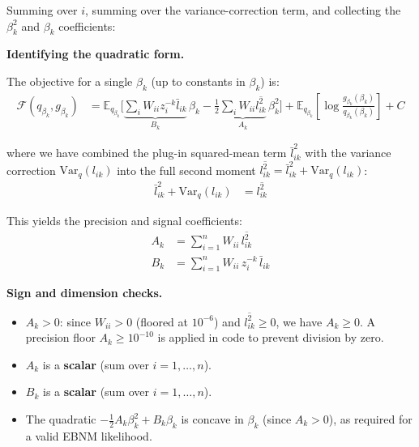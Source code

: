 \documentclass[11pt]{article}
\begin{document}
Summing over $i$, summing over the variance-correction term, and collecting
the $\beta_k^2$ and $\beta_k$ coefficients:

\begin{derivbox}
\textbf{Identifying the quadratic form.}

The objective for a single $\beta_k$ (up to constants in $\beta_k$) is:
\begin{align}
  \mathcal{F}(q_{\beta_k}, g_{\beta_k}) &=
  \mathbb{E}_{q_{\beta_k}}\!\Biggl[
    \underbrace{\sum_i W_{ii} z_i^{-k} \bar{l}_{ik}}_{B_k}\,\beta_k
    - \frac{1}{2}\underbrace{\sum_i W_{ii}\overline{l^2_{ik}}}_{A_k}\,\beta_k^2
  \Biggr]
  + \mathbb{E}_{q_{\beta_k}}\!\left[\log\frac{g_{\beta_k}(\beta_k)}{q_{\beta_k}(\beta_k)}\right]
  + C
  \label{eq:quadratic-form}
\end{align}

where we have combined the plug-in squared-mean term $\bar{l}_{ik}^2$ with
the variance correction $\mathrm{Var}_q(l_{ik})$ into the full second moment
$\overline{l^2_{ik}} = \bar{l}_{ik}^2 + \mathrm{Var}_q(l_{ik})$:
\begin{align}
  \bar{l}_{ik}^2 + \mathrm{Var}_q(l_{ik}) &= \overline{l^2_{ik}}
  \label{eq:second-moment-combine}
\end{align}

This yields the precision and signal coefficients:
\begin{align}
  A_k &= \sum_{i=1}^n W_{ii}\,\overline{l^2_{ik}}
  \label{eq:Ak} \\
  B_k &= \sum_{i=1}^n W_{ii}\,z_i^{-k}\,\bar{l}_{ik}
  \label{eq:Bk}
\end{align}
\end{derivbox}

\begin{verifybox}
\textbf{Sign and dimension checks.}
\begin{itemize}
  \item $A_k > 0$: since $W_{ii} > 0$ (floored at $10^{-6}$) and
        $\overline{l^2_{ik}} \geq 0$, we have $A_k \geq 0$.  A precision
        floor $A_k \geq 10^{-10}$ is applied in code to prevent division
        by zero.
  \item $A_k$ is a \textbf{scalar} (sum over $i = 1,\ldots,n$).
  \item $B_k$ is a \textbf{scalar} (sum over $i = 1,\ldots,n$).
  \item The quadratic $-\frac{1}{2}A_k\beta_k^2 + B_k\beta_k$ is concave in
        $\beta_k$ (since $A_k > 0$), as required for a valid EBNM likelihood.
\end{itemize}
\end{verifybox}
\end{document}
